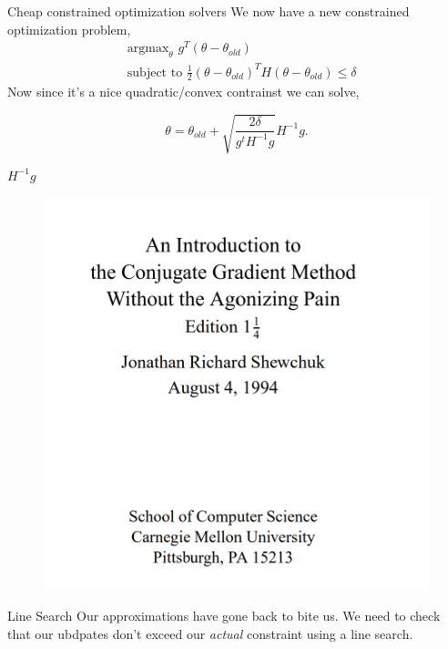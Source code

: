 \documentclass{beamer}
\begin{document}
\begin{frame}{Cheap constrained optimization solvers}
    We now have a new constrained optimization problem, 
    \begin{align*}
        & \text{argmax}_{\theta}\hspace{4pt} g^T (\theta - \theta_{old})  \\
        & \text{subject to  } \frac{1}{2}(\theta - \theta_{old})^TH(\theta - \theta_{old}) \leq \delta
    \end{align*}
Now since it's a nice quadratic/convex contrainst we can solve, 

\begin{equation*}
    \theta = \theta_{old} + \sqrt{\frac{2\delta}{g^tH^{-1}g}} H^{-1}g. 
\end{equation*}
\end{frame}

\begin{frame}{$H^{-1}g$}

\begin{figure}
    \centering
    \includegraphics[width=1.1\linewidth]{trpo_funny_reference.png}
    \label{fig:joke}
\end{figure}    
\end{frame}

\begin{frame}{Line Search}
    Our approximations have gone back to bite us. We need to check that our ubdpates don't exceed our \textit{actual} constraint using a line search. 
\end{frame}
\end{document}
